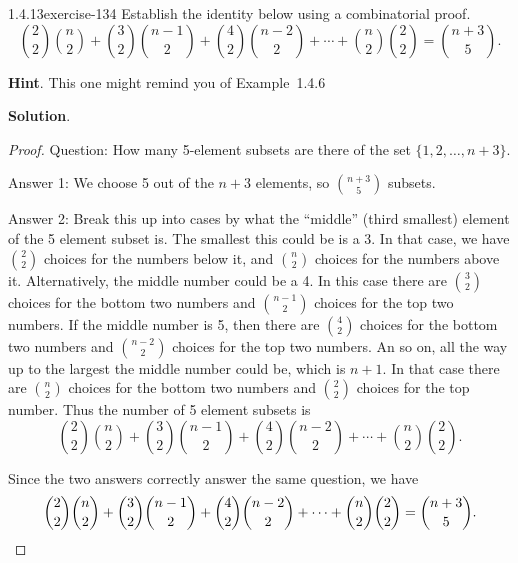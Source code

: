 \documentclass[twoside,11pt,]{book}
\renewcommand{\qedhere}{\relax}
\numberwithin{equation}{chapter}
\begin{document}
\begin{divisionsolution}{1.4.13}{}{exercise-134}%
\hypertarget{p-2164}{}%
Establish the identity below using a combinatorial proof.%
\begin{equation*}
{2 \choose 2}{n \choose 2} + {3 \choose 2}{n-1 \choose 2} + {4\choose 2}{n-2 \choose 2} + \cdots + {n\choose 2}{2\choose 2} = {n+3 \choose 5}\text{.}
\end{equation*}
%
\par\smallskip%
\noindent\textbf{Hint}.\quad%
\hypertarget{p-2165}{}%
This one might remind you of Example~1.4.6%
\par\smallskip%
\noindent\textbf{Solution}.\quad%
\begin{proof}{}
\hypertarget{p-2166}{}%
Question: How many 5-element subsets are there of the set \(\{1,2,\ldots,
n+3\}\).%
\par
\hypertarget{p-2167}{}%
Answer 1: We choose 5 out of the \(n+3\) elements, so \({n+3 \choose 5}\) subsets.%
\par
\hypertarget{p-2168}{}%
Answer 2: Break this up into cases by what the ``middle'' (third smallest) element of the 5 element subset is. The smallest this could be is a 3. In that case, we have \({2 \choose 2}\) choices for the numbers below it, and \({n \choose 2}\) choices for the numbers above it. Alternatively, the middle number could be a 4. In this case there are \({3 \choose 2}\) choices for the bottom two numbers and \({n-1 \choose 2}\) choices for the top two numbers. If the middle number is 5, then there are \({4 \choose 2}\) choices for the bottom two numbers and \({n-2 \choose 2}\) choices for the top two numbers. An so on, all the way up to the largest the middle number could be, which is \(n+1\). In that case there are \({n \choose 2}\) choices for the bottom two numbers and \({2 \choose 2}\) choices for the top number. Thus the number of 5 element subsets is%
\begin{equation*}
{2 \choose 2}{n \choose 2} + {3 \choose 2}{n-1 \choose 2} + {4\choose 2}{n-2 \choose 2} + \cdots + {n\choose 2}{2\choose 2}\text{.}
\end{equation*}
%
\par
\hypertarget{p-2169}{}%
Since the two answers correctly answer the same question, we have%
\begin{equation*}
{2 \choose 2}{n \choose 2} + {3 \choose 2}{n-1 \choose 2} + {4\choose 2}{n-2 \choose 2} + \cdots + {n\choose 2}{2\choose 2} = {n+3 \choose 5}\text{.}\qedhere
\end{equation*}
%
\end{proof}
\end{divisionsolution}%
\end{document}
